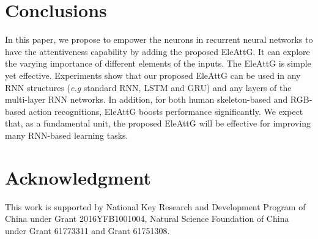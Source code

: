 \documentclass[runningheads]{llncs}
\begin{document}
\section{Conclusions}

In this paper, we propose to empower the neurons in recurrent neural networks to have the attentiveness capability by adding the proposed EleAttG. It can explore the varying importance of different elements of the inputs. The EleAttG is simple yet effective. Experiments show that our proposed EleAttG can be used in any RNN structures ({\it{e.g}} standard RNN, LSTM and GRU) and any layers of the multi-layer RNN networks. In addition, for both human skeleton-based and RGB-based action recognitions, EleAttG boosts performance significantly. We expect that, as a fundamental unit, the proposed EleAttG will be effective for improving many RNN-based learning tasks.

\section*{Acknowledgment}
This work is supported by  National Key Research and Development Program of China under Grant 2016YFB1001004, Natural Science Foundation of China under Grant 61773311  and Grant 61751308.
\clearpage



\end{document}
